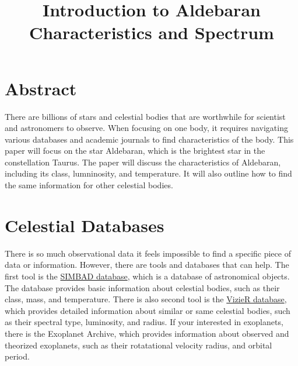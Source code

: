 \documentclass[12pt,oneside,a4paper,english]{article}
\title{Introduction to Aldebaran Characteristics and Spectrum} %
\begin{document}

\doublespacing
\renewcommand{\baselinestretch}{1}\normalsize
\tableofcontents
\renewcommand{\baselinestretch}{1}\normalsize
\thispagestyle{fancy} %
\newpage
\section{Abstract}
There are billions of stars and celestial bodies that are worthwhile for scientist and astronomers to observe. When focusing on one body, it requires navigating various databases and academic journals to find characteristics of the body. This paper will focus on the star Aldebaran, which is the brightest star in the constellation Taurus. The paper will discuss the characteristics of Aldebaran, including its class, lumninosity, and temperature. It will also outline how to find the same information for other celestial bodies. 

\section{Celestial Databases}
There is so much observational data it feels impossible to find a specific piece of data or information. However, there are tools and databases that can help. The first tool is the \href{https://cds.unistra.fr/}{SIMBAD database}, which is a database of astronomical objects. The database provides basic information about celestial bodies, such as their class, mass, and temperature. There is also second tool is the \href{https://vizier.cds.unistra.fr/viz-bin/VizieR}{VizieR database}, which provides detailed information about similar or same celestial bodies, such as their spectral type, luminosity, and radius. If your interested in exoplanets, there is the Exoplanet Archive, which provides information about observed and theorized exoplanets, such as their rotatational velocity radius, and orbital period.
\end{document}
